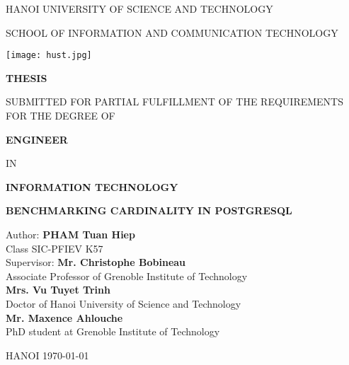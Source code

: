 \renewcommand{\baselinestretch}{1.0}
\begin{titlepage}
	\centering
	{\scshape\Large HANOI UNIVERSITY OF SCIENCE AND TECHNOLOGY \par
	SCHOOL OF INFORMATION AND COMMUNICATION TECHNOLOGY\par}
	\vspace{1cm}
	\texttt{[image: hust.jpg]}\par\vspace{0.5cm}
	{\scshape\huge\bfseries THESIS\par}
	\vspace{1cm}
	{\Large SUBMITTED FOR PARTIAL FULFILLMENT OF
		THE REQUIREMENTS FOR THE DEGREE OF \par}
	\vspace{1cm}
	{\scshape\huge\bfseries ENGINEER \par
	\Large IN \par}
	\vspace{1cm}
	{\scshape\huge\bfseries INFORMATION TECHNOLOGY \par}
	\vspace{1cm}
	{\scshape\huge\bfseries BENCHMARKING CARDINALITY IN POSTGRESQL \par}
	\vspace{1cm}
	\begin{flushleft}
	
	{\large \hspace{3cm}Author:}       {\large\hspace{1.1cm}\bfseries PHAM Tuan Hiep\\}
	{\large\hspace{5.5cm} Class SIC-PFIEV K57\\}
	{\large \hspace{3cm}Supervisor:}       {\large\hspace{0.5cm}\bfseries Mr. Christophe Bobineau\\}
    {\large\hspace{5.5cm} Associate Professor of Grenoble Institute of Technology\\}
    {\large\hspace{5.6cm}\bfseries Mrs. Vu Tuyet Trinh\\}
    {\large\hspace{5.5cm} Doctor of Hanoi University of Science and Technology\\}
    {\large\hspace{5.6cm}\bfseries Mr. Maxence Ahlouche\\}
    {\large\hspace{5.5cm} PhD student at Grenoble Institute of Technology\\}

	\end{flushleft}
	\vspace*{\fill}
	{\large HANOI \today\par}
\end{titlepage}